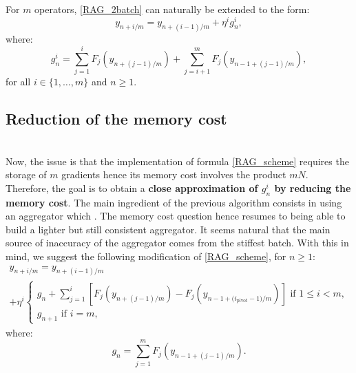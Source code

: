 \documentclass[article,authoryear,jmlmc]{beg_32}             %
\begin{document}
For $m$ operators, \eqref{RAG_2batch} can naturally be extended to the form:
\begin{equation}
	y_{n+i/m} = y_{n+(i-1)/m}+\eta^i g_n^i,
	\label{RAG_scheme}
\end{equation}
where:
\begin{equation}
	g_n^i = \sum_{j=1}^i F_j\left(y_{n+(j-1)/m}\right)+\sum_{j=i+1}^m F_j\left(y_{n-1+(j-1)/m}\right),
	\label{gni}
\end{equation}
for all $i \in \{1,\dots,m\}$ and $n\geq 1$. 

\subsection{Reduction of the memory cost}
\label{red_mem}
~~\\
Now, the issue is that the implementation of formula \eqref{RAG_scheme} requires the storage of $m$ gradients hence its memory cost involves the product $mN$. Therefore, the goal is to obtain a \textbf{close approximation of $g_n^i$ by reducing the memory cost}.
The main ingredient of the previous algorithm consists in using an aggregator which .
The memory cost question hence resumes to being able to build a lighter but still consistent aggregator.
It seems natural that the main source of inaccuracy of the aggregator comes from the stiffest batch. 
With this in mind, we suggest the following modification of \eqref{RAG_scheme}, for $n\geq 1$:
\begin{multline}
	y_{n+i/m} = y_{n+(i-1)/m} \\
	+\eta^i
	\left\{
	\begin{array}{ll}
          g_n+\displaystyle{\sum_{j=1}^i} \left[F_j\left(y_{n+(j-1)/m}\right)-F_j\left(y_{{n-1+(i_{\text{pivot}}-1})/m}\right)\right] \text{ if } 1\leq i<m,\\
		g_{n+1} \text{ if } i=m,
	\end{array}
	\right.
	\label{RAGL_splitting}
\end{multline}
where:
\begin{equation*}
	g_n = \sum_{j=1}^m F_j\left(y_{n-1+(j-1)/m}\right).
\end{equation*}
\end{document}
